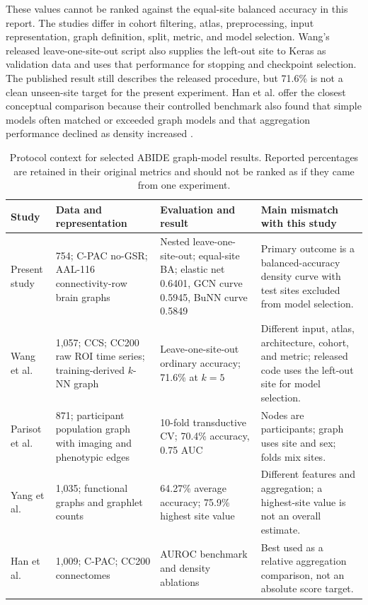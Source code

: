 \documentclass[11pt,a4paper]{article}
\begin{document}
These values cannot be ranked against the equal-site balanced accuracy in this
report. The studies differ in cohort filtering, atlas, preprocessing, input
representation, graph definition, split, metric, and model selection. Wang's
released leave-one-site-out script also supplies the left-out site to Keras as
validation data and uses that performance for stopping and checkpoint
selection. The published result still describes the released procedure, but
71.6\% is not a clean unseen-site target for the present experiment. Han et
al. offer the closest conceptual comparison because their controlled benchmark
also found that simple models often matched or exceeded graph models and that
aggregation performance declined as density increased
\cite{han2026rethinking}.

\begin{table}[htbp]
\centering
\caption{Protocol context for selected ABIDE graph-model results. Reported
percentages are retained in their original metrics and should not be ranked
as if they came from one experiment.}
\label{tab:literature-context}
\footnotesize
\begin{tabularx}{\textwidth}{@{}p{2.4cm}p{3.0cm}p{3.1cm}Y@{}}
\toprule
\textbf{Study} & \textbf{Data and representation} & \textbf{Evaluation and result} & \textbf{Main mismatch with this study} \\
\midrule
Present study & 754; C-PAC no-GSR; AAL-116 connectivity-row brain graphs & Nested leave-one-site-out; equal-site BA; elastic net 0.6401, GCN curve 0.5945, BuNN curve 0.5849 & Primary outcome is a balanced-accuracy density curve with test sites excluded from model selection. \\
Wang et al. \cite{wang2021cgcn} & 1,057; CCS; CC200 raw ROI time series; training-derived $k$-NN graph & Leave-one-site-out ordinary accuracy; 71.6\% at $k=5$ & Different input, atlas, architecture, cohort, and metric; released code uses the left-out site for model selection. \\
Parisot et al. \cite{parisot2018disease} & 871; participant population graph with imaging and phenotypic edges & 10-fold transductive CV; 70.4\% accuracy, 0.75 AUC & Nodes are participants; graph uses site and sex; folds mix sites. \\
Yang et al. \cite{yang2022graphletgcn} & 1,035; functional graphs and graphlet counts & 64.27\% average accuracy; 75.9\% highest site value & Different features and aggregation; a highest-site value is not an overall estimate. \\
Han et al. \cite{han2026rethinking} & 1,009; C-PAC; CC200 connectomes & AUROC benchmark and density ablations & Best used as a relative aggregation comparison, not an absolute score target. \\
\bottomrule
\end{tabularx}
\end{table}
\end{document}
